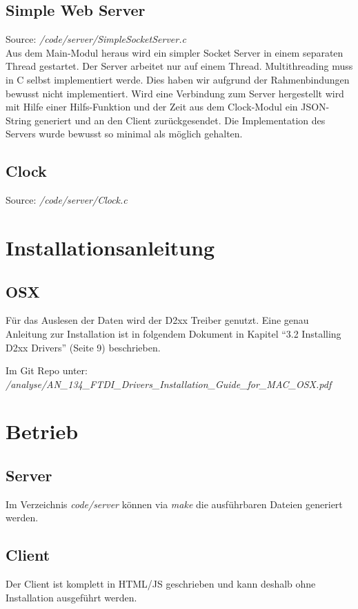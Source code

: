 \subsection{Simple Web Server}
Source: \textit{/code/server/SimpleSocketServer.c}\\
Aus dem Main-Modul heraus wird ein simpler Socket Server in einem separaten Thread gestartet. Der Server arbeitet nur auf einem Thread. Multithreading muss in C selbst implementiert werde. Dies haben wir aufgrund der Rahmenbindungen bewusst nicht implementiert. Wird eine Verbindung zum Server hergestellt wird mit Hilfe einer Hilfs-Funktion und der Zeit aus dem Clock-Modul ein JSON-String generiert und an den Client zurückgesendet. Die Implementation des Servers wurde bewusst so minimal als möglich gehalten.

\subsection{Clock}
Source: \textit{/code/server/Clock.c}\\

\section{Installationsanleitung}
\subsection{OSX}
Für das Auslesen der Daten wird der D2xx Treiber genutzt. Eine genau Anleitung zur Installation ist in folgendem Dokument in Kapitel "`3.2 Installing D2xx Drivers"' (Seite 9) beschrieben.

Im Git Repo unter:\\
\textit{/analyse/AN\_134\_FTDI\_Drivers\_Installation\_Guide\_for\_MAC\_OSX.pdf}


\section{Betrieb}
\subsection{Server}
Im Verzeichnis \textit{code/server} können via \textit{make} die ausführbaren Dateien generiert werden.

\subsection{Client}
Der Client ist komplett in HTML/JS geschrieben und kann deshalb ohne Installation ausgeführt werden.

